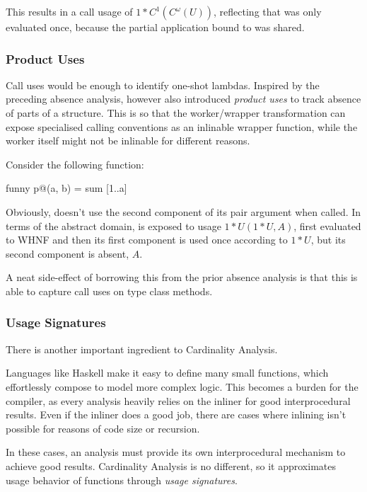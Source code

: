 This results in a call usage of $1*C^1(C^\omega(U))$, reflecting that  was only evaluated once, because the partial application bound to  was shared.

\subsubsection{Product Uses}

Call uses would be enough to identify one-shot lambdas.
Inspired by the preceding absence analysis, \textcite{card} however also introduced \emph{product uses} to track absence of parts of a structure.
This is so that the worker/wrapper transformation can expose specialised calling conventions as an inlinable wrapper function, while the worker itself might not be inlinable for different reasons.

Consider the following  function:
\begin{haskellcode}
  funny p@(a, b) = sum [1..a]
\end{haskellcode}

Obviously,  doesn't use the second component of its pair argument when called.
In terms of the abstract domain,  is exposed to usage $1*U(1*U, A)$, \eg first evaluated to WHNF and then its first component is used once according to $1*U$, but its second component is absent, $A$.

A neat side-effect of borrowing this from the prior absence analysis is that this is able to capture call uses on type class methods.

\subsubsection{Usage Signatures}

There is another important ingredient to Cardinality Analysis.

Languages like Haskell make it easy to define many small functions, which effortlessly compose to model more complex logic.
This becomes a burden for the compiler, as every analysis heavily relies on the inliner for good interprocedural results.
Even if the inliner does a good job, there are cases where inlining isn't possible for reasons of code size or recursion.

In these cases, an analysis must provide its own interprocedural mechanism to achieve good results.
Cardinality Analysis is no different, so it approximates usage behavior of functions through \emph{usage signatures}.

